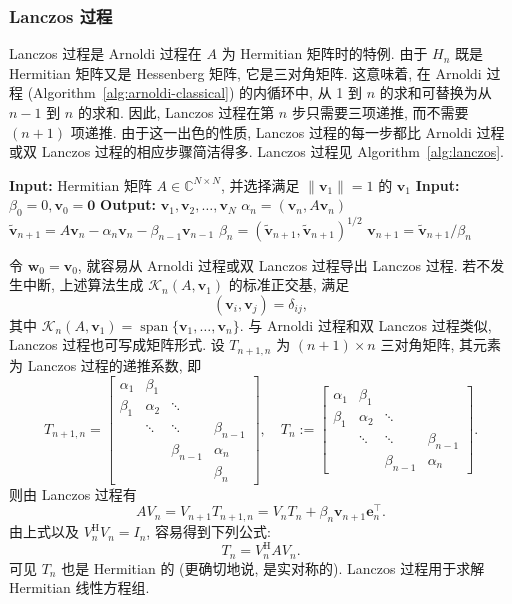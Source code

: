 \subsubsection{{Lanczos 过程}}\label{subsec:lanczos-process}
{Lanczos 过程是 Arnoldi 过程在 $A$ 为 Hermitian 矩阵时的特例. 由于 $H_n$ 既是 Hermitian 矩阵又是 Hessenberg 矩阵, 它是三对角矩阵. 这意味着, 在 Arnoldi 过程 (Algorithm~\ref{alg:arnoldi-classical}) 的内循环中, 从 1 到 $n$ 的求和可替换为从 $n-1$ 到 $n$ 的求和. 因此, Lanczos 过程在第 $n$ 步只需要三项递推, 而不需要 $(n+1)$ 项递推. 由于这一出色的性质, Lanczos 过程的每一步都比 Arnoldi 过程或双 Lanczos 过程的相应步骤简洁得多. Lanczos 过程见 Algorithm~\ref{alg:lanczos}.}
\begin{algorithm}[H]\caption{{Lanczos 过程}}\label{alg:lanczos}
\begin{algorithmic}[1]
\Statex\textbf{Input:} {Hermitian 矩阵 $A\in\mathbb C^{N\times N}$, 并选择满足 $\|\bm v_1\|=1$ 的 $\bm v_1$}
\Statex\textbf{Input:} $\beta_0=0,\bm v_0=\bm0$
\Statex\textbf{Output:} $\bm v_1,\bm v_2,\ldots,\bm v_N$
\State $\alpha_n=(\bm v_n,A\bm v_n)$
\State $\tilde{\bm v}_{n+1}=A\bm v_n-\alpha_n\bm v_n-\beta_{n-1}\bm v_{n-1}$
\State $\beta_n=(\tilde{\bm v}_{n+1},\tilde{\bm v}_{n+1})^{1/2}$
\State $\bm v_{n+1}=\tilde{\bm v}_{n+1}/\beta_n$
\EndFor
\end{algorithmic}\end{algorithm}
{令 $\bm w_0=\bm v_0$, 就容易从 Arnoldi 过程或双 Lanczos 过程导出 Lanczos 过程. 若不发生中断, 上述算法生成 $\mathcal K_n(A,\bm v_1)$ 的标准正交基, 满足}
\[(\bm v_i,\bm v_j)=\delta_{ij},\]
{其中 $\mathcal K_n(A,\bm v_1)=\operatorname{span}\{\bm v_1,\ldots,\bm v_n\}$.}
{与 Arnoldi 过程和双 Lanczos 过程类似, Lanczos 过程也可写成矩阵形式. 设 $T_{n+1,n}$ 为 $(n+1)\times n$ 三对角矩阵, 其元素为 Lanczos 过程的递推系数, 即}
\[
T_{n+1,n}=\begin{bmatrix}\alpha_1&\beta_1&&\\\beta_1&\alpha_2&\ddots&\\&\ddots&\ddots&\beta_{n-1}\\&&\beta_{n-1}&\alpha_n\\&&&\beta_n\end{bmatrix},\quad
T_n:=\begin{bmatrix}\alpha_1&\beta_1&&\\\beta_1&\alpha_2&\ddots&\\&\ddots&\ddots&\beta_{n-1}\\&&\beta_{n-1}&\alpha_n\end{bmatrix}.
\]
{则由 Lanczos 过程有}
\begin{equation}\label{eq:lanczos-matrix-relation}
AV_n=V_{n+1}T_{n+1,n}=V_nT_n+\beta_n\bm v_{n+1}\bm e_n^\top.
\end{equation}
{由上式以及 $V_n^{\mathrm H}V_n=I_n$, 容易得到下列公式:}
\begin{equation}\label{eq:lanczos-projected-matrix}
T_n=V_n^{\mathrm H}AV_n.
\end{equation}
{可见 $T_n$ 也是 Hermitian 的 (更确切地说, 是实对称的). Lanczos 过程用于求解 Hermitian 线性方程组.}
